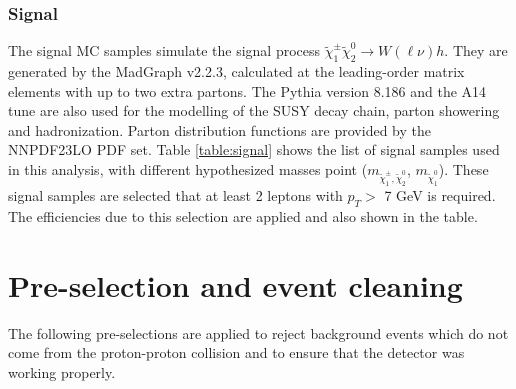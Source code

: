\subsubsection{Signal}
The signal MC samples simulate the signal process $\tilde{\chi}_1^\pm \tilde{\chi}_2^0 \rightarrow W(\ell\nu)h$.
They are generated by the {\sc MadGraph} v2.2.3, calculated at the leading-order matrix elements with up to two extra partons.
The {\sc Pythia} version 8.186 and the A14 tune are also used for the modelling of the SUSY decay chain, parton showering and hadronization.
Parton distribution functions are provided by the NNPDF23LO PDF set.
Table \ref{table:signal} shows the list of signal samples used in this analysis, with different hypothesized masses point ($m_{\tilde{\chi}_1^\pm , \tilde{\chi}_2^0}$, $m_{\tilde{\chi}_1^0}$).
These signal samples are selected that at least 2 leptons with $p_{T} >$ 7 GeV is required.
The efficiencies due to this selection are applied and also shown in the table.

\section{Pre-selection and event cleaning}
\label{event_cleaning}
The following pre-selections are applied to reject background events which do not come from the proton-proton collision and to ensure that the detector was working properly.

